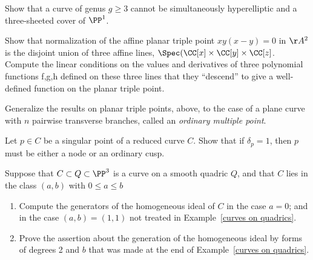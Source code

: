 \begin{exercise}\label{gonality exclusion}
Show that a curve of genus $g \geq 3$ cannot be simultaneously hyperelliptic and a three-sheeted cover of $\PP^1$.
\end{exercise}

\begin{exercise}\label{planar triple pt}
Show that normalization of the affine planar triple point $xy(x-y) = 0$ in $\AA^2$ is the disjoint union of three
affine lines, $\Spec(\CC[x] \times \CC[y]\times \CC[z]$. Compute the linear conditions on the values and derivatives of three polynomial functions f,g,h defined on
these three lines that they ``descend'' to give a well-defined function on the planar triple point.
\end{exercise}

\begin{exercise} Generalize the results on planar triple points, above, to the case of a plane curve with $n$ pairwise
transverse branches, called an \emph{ordinary multiple point}.
\end{exercise}

\begin{exercise}\label{delta=1 characterization}
Let $p \in C$ be a singular point of a reduced curve $C$. Show that if $\delta_p = 1$, then $p$ must be either a node or an ordinary cusp.
\end{exercise}

\begin{exercise}\label{curve on rank 4 quadric}
 Suppose that $C\subset Q\subset \PP^{3}$ is a curve on a smooth quadric $Q$, and that $C$ lies
 in the class $(a,b)$ with $0\leq a\leq b$
 
\begin{enumerate}
 \item Compute the generators of the homogeneous ideal of $C$ in the case $a=0$; and in the case
 $(a,b) = (1,1)$ not treated in Example~\ref{curves on quadrics}.
 \item Prove the assertion about the generation of the homogeneous ideal by forms of degrees 2 and $b$
 that was made at the end of Example~\ref{curves on quadrics}.
\end{enumerate}
\end{exercise}

 